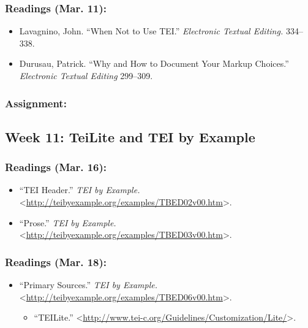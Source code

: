 \documentclass[]{article}
\begin{document}
\subsubsection{Readings (Mar. 11):}\label{readings-mar.-11}

\begin{itemize}
\itemsep1pt\parskip0pt
\item
  Lavagnino, John. ``When Not to Use TEI.'' \emph{Electronic Textual
  Editing.} 334--338.
\item
  Durusau, Patrick. ``Why and How to Document Your Markup Choices.''
  \emph{Electronic Textual Editing} 299--309.
\end{itemize}

\subsubsection{Assignment:}\label{assignment-1}

\subsection{Week 11: TeiLite and TEI by
Example}\label{week-11-teilite-and-tei-by-example}

\subsubsection{Readings (Mar. 16):}\label{readings-mar.-16}

\begin{itemize}
\itemsep1pt\parskip0pt
\item
  ``TEI Header.'' \emph{TEI by Example.}
  \textless{}\url{http://teibyexample.org/examples/TBED02v00.htm}\textgreater{}.
\item
  ``Prose.'' \emph{TEI by Example.}
  \textless{}\url{http://teibyexample.org/examples/TBED03v00.htm}\textgreater{}.
\end{itemize}

\subsubsection{Readings (Mar. 18):}\label{readings-mar.-18}

\begin{itemize}
\itemsep1pt\parskip0pt
\item
  ``Primary Sources.'' \emph{TEI by Example.}
  \textless{}\url{http://teibyexample.org/examples/TBED06v00.htm}\textgreater{}.

  \begin{itemize}
  \itemsep1pt\parskip0pt
  \item
    ``TEILite.''
    \textless{}\url{http://www.tei-c.org/Guidelines/Customization/Lite/}\textgreater{}.
  \end{itemize}
\end{itemize}
\end{document}
